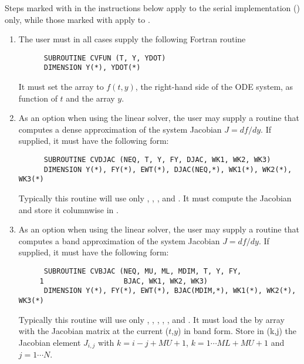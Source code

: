Steps marked with {\s} in the instructions below apply to the serial
{\nvector} implementation ({\nvecs}) only, while those marked with {\p}
apply to {\nvecp}.

\begin{enumerate}
  
\item
  The user must in all cases supply the following Fortran routine
\begin{verbatim}
      SUBROUTINE CVFUN (T, Y, YDOT)
      DIMENSION Y(*), YDOT(*)
\end{verbatim}
  It must set the  array to $f(t,y)$, the right-hand side of the ODE
  system, as function of  $t$ and the array  $y$.  
  
\item {\s}
  As an option when using the {\dense} linear solver, the user may supply a
  routine that computes a dense approximation of the system Jacobian 
  $J = df/dy$. If supplied, it must have the following form:
\begin{verbatim}
      SUBROUTINE CVDJAC (NEQ, T, Y, FY, DJAC, WK1, WK2, WK3)
      DIMENSION Y(*), FY(*), EWT(*), DJAC(NEQ,*), WK1(*), WK2(*), WK3(*)
\end{verbatim}
  Typically this routine will use only , , , and . 
  It must compute the Jacobian and store it columnwise in .
  
\item {\s}
  As an option when using the {\band} linear solver, the user may supply a
  routine that computes a band approximation of the system Jacobian 
  $J = df/dy$. If supplied, it must have the following form:
\begin{verbatim}
      SUBROUTINE CVBJAC (NEQ, MU, ML, MDIM, T, Y, FY,
     1                   BJAC, WK1, WK2, WK3)
      DIMENSION Y(*), FY(*), EWT(*), BJAC(MDIM,*), WK1(*), WK2(*), WK3(*)
\end{verbatim}
  Typically this routine will use only , , , , 
  , and . 
  It must load the  by  array  with the Jacobian matrix at the
  current ($t$,$y$) in band form.  Store in (k,j) the Jacobian element $J_{i,j}$
  with $k = i - j + MU + 1$, $k = 1 \cdots ML+MU+1$ and $j = 1 \cdots N$.
  

\end{enumerate}
